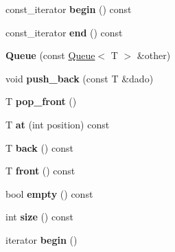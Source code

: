 \begin{DoxyCompactItemize}
\item 
\hypertarget{classQueue_a652c1526d0a99cc153bec8df86105cca}{const\-\_\-iterator {\bfseries begin} () const }\label{classQueue_a652c1526d0a99cc153bec8df86105cca}

\item 
\hypertarget{classQueue_abdd805a2bb752ed37ab2dbc1493a9e24}{const\-\_\-iterator {\bfseries end} () const }\label{classQueue_abdd805a2bb752ed37ab2dbc1493a9e24}

\item 
\hypertarget{classQueue_ac3b3b360bf22dd4ef5874449880ece63}{{\bfseries Queue} (const \hyperlink{classQueue}{Queue}$<$ T $>$ \&other)}\label{classQueue_ac3b3b360bf22dd4ef5874449880ece63}

\item 
\hypertarget{classQueue_ad683a72dcd5d34a7aa0b906aed09d32f}{void {\bfseries push\-\_\-back} (const T \&dado)}\label{classQueue_ad683a72dcd5d34a7aa0b906aed09d32f}

\item 
\hypertarget{classQueue_a21992fd19ab9b53682b03059ecd04c61}{T {\bfseries pop\-\_\-front} ()}\label{classQueue_a21992fd19ab9b53682b03059ecd04c61}

\item 
\hypertarget{classQueue_a91492afa6103be0ffdfcc886fc996b25}{T {\bfseries at} (int position) const }\label{classQueue_a91492afa6103be0ffdfcc886fc996b25}

\item 
\hypertarget{classQueue_ae9af6d3cfe017a2f1bf1fd35ce9e99c3}{T {\bfseries back} () const }\label{classQueue_ae9af6d3cfe017a2f1bf1fd35ce9e99c3}

\item 
\hypertarget{classQueue_a057aac4f78168ea144118dac4222d192}{T {\bfseries front} () const }\label{classQueue_a057aac4f78168ea144118dac4222d192}

\item 
\hypertarget{classQueue_a74e1442a08f38177e7dd7f7c8af22d30}{bool {\bfseries empty} () const }\label{classQueue_a74e1442a08f38177e7dd7f7c8af22d30}

\item 
\hypertarget{classQueue_ad13b6467a10f5b6b8b78716787a77fd4}{int {\bfseries size} () const }\label{classQueue_ad13b6467a10f5b6b8b78716787a77fd4}

\item 
\hypertarget{classQueue_a0f8479ac20e00d122558dce6c3c71473}{iterator {\bfseries begin} ()}\label{classQueue_a0f8479ac20e00d122558dce6c3c71473}


\end{DoxyCompactItemize}
